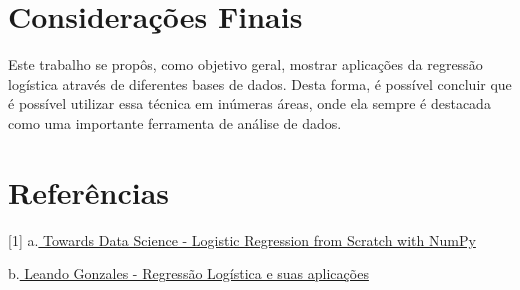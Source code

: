 \documentclass[12pt]{article}
\begin{document}
\clearpage
\section{Considerações Finais}

\hspace{0.4cm}Este trabalho se propôs, como objetivo geral, mostrar aplicações da regressão logística através de diferentes bases de dados. Desta forma, é possível concluir que é possível utilizar essa técnica em inúmeras áreas, onde ela sempre é destacada como uma importante ferramenta de análise de dados. 

\newpage
\section{Referências}

[1] a.\href{https://towardsdatascience.com/logistic-regression-from-scratch-with-numpy-da4cc3121ece}{ Towards Data Science - Logistic Regression from Scratch with NumPy}

\noindent [2] b.\href{https://monografias.ufma.br/jspui/bitstream/123456789/3572/1/LEANDRO-GONZALEZ.pdf}{ Leando Gonzales - Regressão Logística e suas aplicações}
\end{document}
